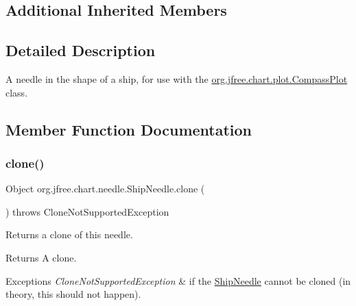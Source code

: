 \subsection*{Additional Inherited Members}


\subsection{Detailed Description}
A needle in the shape of a ship, for use with the \mbox{\hyperlink{classorg_1_1jfree_1_1chart_1_1plot_1_1_compass_plot}{org.\+jfree.\+chart.\+plot.\+Compass\+Plot}} class. 

\subsection{Member Function Documentation}
\mbox{\label{classorg_1_1jfree_1_1chart_1_1needle_1_1_ship_needle_aa7a3c4048bfd3eee00bbeb41821f22a6}} 
\subsubsection{\texorpdfstring{clone()}{clone()}}
{\footnotesize\ttfamily Object org.\+jfree.\+chart.\+needle.\+Ship\+Needle.\+clone (\begin{DoxyParamCaption}{ }\end{DoxyParamCaption}) throws Clone\+Not\+Supported\+Exception}

Returns a clone of this needle.

\begin{DoxyReturn}{Returns}
A clone.
\end{DoxyReturn}

\begin{DoxyExceptions}{Exceptions}
{\em Clone\+Not\+Supported\+Exception} & if the {\ttfamily \mbox{\hyperlink{classorg_1_1jfree_1_1chart_1_1needle_1_1_ship_needle}{Ship\+Needle}}} cannot be cloned (in theory, this should not happen). \\
\hline
\end{DoxyExceptions}
\mbox{\label{classorg_1_1jfree_1_1chart_1_1needle_1_1_ship_needle_a67cead7951249e3791e95f4736bf2c07}} 
